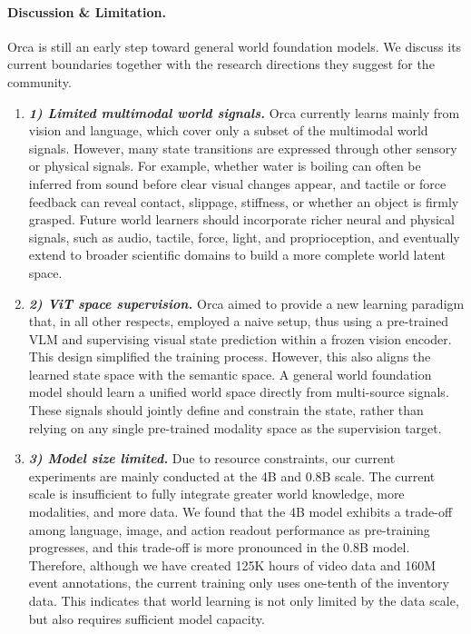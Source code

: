 \documentclass{llmxive}
\begin{document}
\vspace{-0.5em}
\paragraph{Discussion \& Limitation.}
Orca is still an early step toward general world foundation models. We discuss its current boundaries together with the research directions they suggest for the community.

\vspace{-1ex}
\begin{enumerate}[
    leftmargin=1.35em,
    itemsep=0.35em,
    topsep=0.35em,
    parsep=0em
]


    \item[] \textit{\textbf{1) Limited multimodal world signals.}}
    Orca currently learns mainly from vision and language, which cover only a subset of the multimodal world signals. However, many state transitions are expressed through other sensory or physical signals. For example, whether water is boiling can often be inferred from sound before clear visual changes appear, and tactile or force feedback can reveal contact, slippage, stiffness, or whether an object is firmly grasped. Future world learners should incorporate richer neural and physical signals, such as audio, tactile, force, light, and proprioception, and eventually extend to broader scientific domains to build a more complete world latent space.


    \item[] \textit{\textbf{2) ViT space supervision.}} Orca aimed to provide a new learning paradigm that, in all other respects, employed a naive setup, thus using a pre-trained VLM and supervising visual state prediction within a frozen vision encoder. This design simplified the training process. However, this also aligns the learned state space with the semantic space. A general world foundation model should learn a unified world space directly from multi-source signals. These signals should jointly define and constrain the state, rather than relying on any single pre-trained modality space as the supervision target.

    \item[] \textit{\textbf{3) Model size limited.}} Due to resource constraints, our current experiments are mainly conducted at the 4B and 0.8B scale. The current scale is insufficient to fully integrate greater world knowledge, more modalities, and more data. We found that the 4B model exhibits a trade-off among language, image, and action readout performance as pre-training progresses, and this trade-off is more pronounced in the 0.8B model. Therefore, although we have created 125K hours of video data and 160M event annotations, the current training only uses one-tenth of the inventory data. This indicates that world learning is not only limited by the data scale, but also requires sufficient model capacity.


\end{enumerate}
\end{document}
